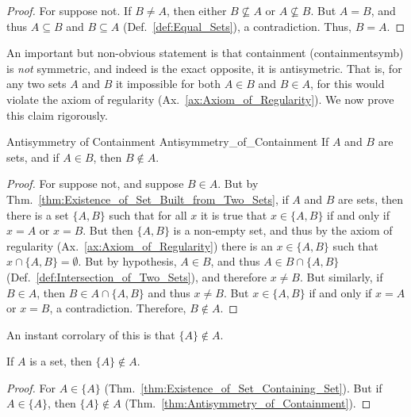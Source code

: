         \begin{proof}
            For suppose not. If $B\ne{A}$, then either $B\nsubseteq{A}$ or
            $A\nsubseteq{B}$. But $A=B$, and thus $A\subseteq{B}$  and
            $B\subseteq{A}$ (Def.~\ref{def:Equal_Sets}),
            a contradiction. Thus, $B=A$.
        \end{proof}
        An important but non-obvious statement is that containment
        (\gls{containmentsymb}) is \textit{not} symmetric, and indeed is the
        exact opposite, it is antisymetric. That is, for any two sets $A$ and
        $B$ it impossible for both $A\in{B}$ and $B\in{A}$, for this would
        violate the axiom of regularity
        (Ax.~\ref{ax:Axiom_of_Regularity}). We now prove this claim rigorously.
        \begin{ltheorem}{Antisymmetry of Containment}
                        {Antisymmetry_of_Containment}
            If $A$ and $B$ are sets, and if $A\in{B}$, then $B\notin{A}$.
        \end{ltheorem}
        \begin{proof}
            For suppose not, and suppose $B\in{A}$. But by
            Thm.~\ref{thm:Existence_of_Set_Built_from_Two_Sets}, if $A$ and $B$
            are sets, then there is a set $\{A,B\}$ such that for all $x$ it is
            true that $x\in\{A,B\}$ if and only if $x=A$ or $x=B$. But then
            $\{A,B\}$ is a non-empty set, and thus by the axiom of regularity
            (Ax.~\ref{ax:Axiom_of_Regularity}) there is an $x\in\{A,B\}$ such
            that $x\cap\{A,B\}=\emptyset$. But by hypothesis, $A\in{B}$, and
            thus $A\in{B}\cap\{A,B\}$ (Def.~\ref{def:Intersection_of_Two_Sets}),
            and therefore $x\ne{B}$. But similarly, if $B\in{A}$, then
            $B\in{A}\cap\{A,B\}$ and thus $x\ne{B}$. But $x\in\{A,B\}$ if and
            only if $x=A$ or $x=B$, a contradiction. Therefore, $B\notin{A}$.
        \end{proof}
        An instant corrolary of this is that $\{A\}\notin{A}$.
        \begin{theorem}
            \label{thm:Set_Containing_A_is_not_Element_of_A}%
            If $A$ is a set, then $\{A\}\notin{A}$.
        \end{theorem}
        \begin{proof}
            For $A\in\{A\}$ (Thm.~\ref{thm:Existence_of_Set_Containing_Set}).
            But if $A\in\{A\}$, then $\{A\}\notin{A}$
            (Thm.~\ref{thm:Antisymmetry_of_Containment}).
        \end{proof}
